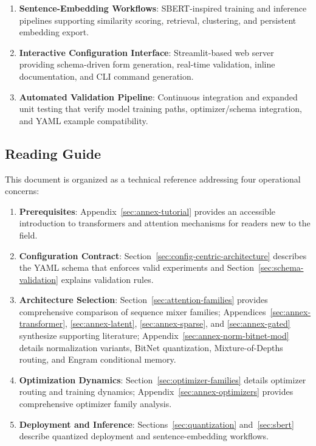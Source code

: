 \begin{enumerate}[leftmargin=*]
    \item \textbf{Sentence-Embedding Workflows}: SBERT-inspired training and inference pipelines supporting similarity scoring, retrieval, clustering, and persistent embedding export.
    \item \textbf{Interactive Configuration Interface}: Streamlit-based web server providing schema-driven form generation, real-time validation, inline documentation, and CLI command generation.
    \item \textbf{Automated Validation Pipeline}: Continuous integration and expanded unit testing that verify model training paths, optimizer/schema integration, and YAML example compatibility.
\end{enumerate}

\subsection{Reading Guide}

This document is organized as a technical reference addressing four operational concerns:
\begin{enumerate}[leftmargin=*]
    \item \textbf{Prerequisites}: Appendix~\ref{sec:annex-tutorial} provides an accessible introduction to transformers and attention mechanisms for readers new to the field.
    \item \textbf{Configuration Contract}: Section~\ref{sec:config-centric-architecture} describes the YAML schema that enforces valid experiments and Section~\ref{sec:schema-validation} explains validation rules.
    \item \textbf{Architecture Selection}: Section~\ref{sec:attention-families} provides comprehensive comparison of sequence mixer families; Appendices~\ref{sec:annex-transformer}, \ref{sec:annex-latent}, \ref{sec:annex-sparse}, and \ref{sec:annex-gated} synthesize supporting literature; Appendix~\ref{sec:annex-norm-bitnet-mod} details normalization variants, BitNet quantization, Mixture-of-Depths routing, and Engram conditional memory.
    \item \textbf{Optimization Dynamics}: Section~\ref{sec:optimizer-families} details optimizer routing and training dynamics; Appendix~\ref{sec:annex-optimizers} provides comprehensive optimizer family analysis.
    \item \textbf{Deployment and Inference}: Sections~\ref{sec:quantization} and~\ref{sec:sbert} describe quantized deployment and sentence-embedding workflows.
\end{enumerate}

